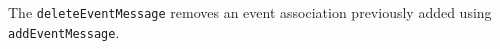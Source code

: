 The \verb+deleteEventMessage+ removes an event association previously added using \verb+addEventMessage+.
